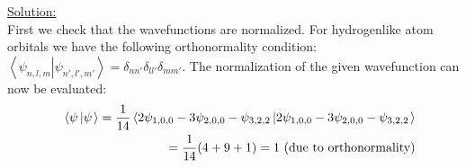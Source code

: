 \noindent
\underline{Solution:}\\

First we check that the wavefunctions are normalized. For hydrogenlike atom orbitals we have the following orthonormality condition: $\left<\psi_{n,l,m}\left|\psi_{n',l',m'}\right.\right> = \delta_{nn'}\delta_{ll'}\delta_{mm'}$. The normalization of the given wavefunction can now be evaluated:
\begin{eqnarray}
\nonumber
& & \left<\psi\left|\psi\right.\right> = \frac{1}{14}\left<2\psi_{1,0,0} - 3\psi_{2,0,0} - \psi_{3,2,2}\left|2\psi_{1,0,0} - 3\psi_{2,0,0} - \psi_{3,2,2}\right.\right>\\
\nonumber
& & = \frac{1}{14}(4 + 9 + 1) = 1\textnormal{ (due to orthonormality)}
\end{eqnarray}

